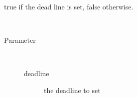 \begin{description}
\begin{description}
true if the dead line is set, false otherwise.
\end{description}
\item[{\ltdHypertarget{ontologyFramework.OFProcedureManagment.ProcedureConcurrenceData.setDeadline(java.util.Date)}{setDeadline}\label{ontologyFramework.OFProcedureManagment.ProcedureConcurrenceData.setDeadline(java.util.Date)}}]
~ 
\begin{description}
\item[Parameter] ~
\begin{description}
\item[deadline]
the deadline to set
\end{description}
\end{description}
\end{description}
